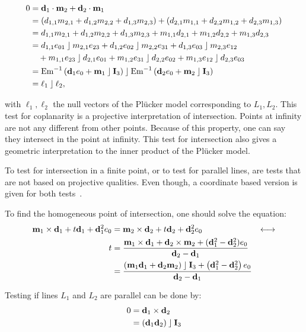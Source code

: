 \begin{align*}
  0 &= \mathbf{d}_1 \mathbin{\cdot} \mathbf{m}_2 + \mathbf{d}_2 \mathbin{\cdot} \mathbf{m}_1 \\
    &= \left( d_{1,1} m_{2,1} + d_{1,2} m_{2,2} + d_{1,3} m_{2,3} \right) + \left( d_{2,1} m_{1,1} + d_{2,2} m_{1,2} + d_{2,3} m_{1,3} \right) \\
    &= d_{1,1} m_{2,1} + d_{1,2} m_{2,2} + d_{1,3} m_{2,3} + m_{1,1} d_{2,1} + m_{1,2} d_{2,2} + m_{1,3} d_{2,3} \\
    &= d_{1,1} e_{01} \mathbin{\rfloor} m_{2,1} e_{23} + d_{1,2} e_{02} \mathbin{\rfloor} m_{2,2} e_{31} + d_{1,3} e_{03} \mathbin{\rfloor} m_{2,3} e_{12} \\
    &\quad + m_{1,1} e_{23} \mathbin{\rfloor} d_{2,1} e_{01} + m_{1,2} e_{31} \mathbin{\rfloor} d_{2,2} e_{02} + m_{1,3} e_{12} \mathbin{\rfloor} d_{2,3} e_{03} \\
    &= \operatorname{Em}^{-1}\left( \mathbf{d}_1e_0 + \mathbf{m}_1 \mathbin{\rfloor} \mathbf{I}_3 \right) \mathbin{\rfloor} \operatorname{Em}^{-1}\left( \mathbf{d}_2e_0 + \mathbf{m}_2 \mathbin{\rfloor} \mathbf{I}_3 \right) \\
    &= \ell_1 \mathbin{\rfloor} \ell_2,
\end{align*}

with $\ell_1, \ell_2$ the null vectors of the Pl\"ucker model corresponding to $L_1, L_2$.  This test for coplanarity is a projective interpretation of intersection.  Points at infinity are not any different from other points.  Because of this property, one can say they intersect in the point at infinity.  This test for intersection also gives a geometric interpretation to the inner product of the Pl\"ucker model.

To test for intersection in a finite point, or to test for parallel lines, are tests that are not based on projective qualities.  Even though, a coordinate based version is given for both tests~\cite{Shoemake}.

To find the homogeneous point of intersection, one should solve the equation:
\begin{align*}
  \mathbf{m}_1 \times \mathbf{d}_1 + t \mathbf{d}_1 + \mathbf{d}_1^2 e_0 &= \mathbf{m}_2 \times \mathbf{d}_2 + t \mathbf{d}_2 + \mathbf{d}_2^2 e_0 &\longleftrightarrow \\
  t &= \frac{\mathbf{m}_1 \times \mathbf{d}_1 + \mathbf{d}_2 \times \mathbf{m}_2 + (\mathbf{d}_1^2 - \mathbf{d}_2^2) e_0}{\mathbf{d}_2 - \mathbf{d}_1} \\
  &= \frac{\left( \mathbf{m}_1 \mathbf{d}_1 + \mathbf{d}_2 \mathbf{m}_2 \right) \mathbin{\rfloor} \mathbf{I}_3 + \left( \mathbf{d}_1^2 - \mathbf{d}_2^2 \right) e_0} {\mathbf{d}_2 - \mathbf{d}_1}
\end{align*}

Testing if lines $L_1$ and $L_2$ are parallel can be done by: 
\begin{align*}
  0 &= \mathbf{d}_1 \times \mathbf{d}_2 \\
    &= \left( \mathbf{d}_1 \mathbf{d}_2 \right) \mathbin{\rfloor} \mathbf{I}_3
\end{align*}

